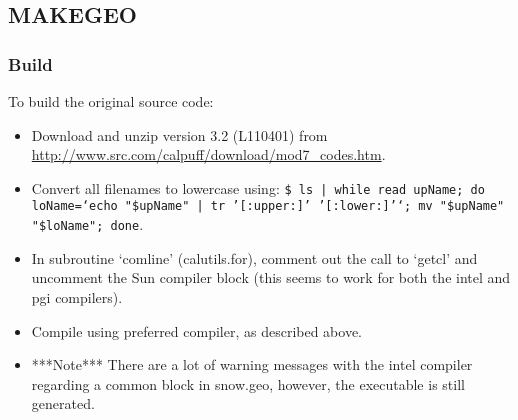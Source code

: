 \documentclass[10pt,a4paper]{article}
\begin{document}
\subsection{MAKEGEO}
\subsubsection{Build}
To build the original source code:
\begin{itemize}
\item Download and unzip version 3.2 (L110401) from \url{http://www.src.com/calpuff/download/mod7_codes.htm}.
\item Convert all filenames to lowercase using: \texttt{\$ ls | while read upName; do loName=`echo "\${upName}" | tr '[:upper:]' '[:lower:]'`; mv "\$upName" "\$loName"; done}.
\item In subroutine `comline' (calutils.for), comment out the call to `getcl' and uncomment the Sun compiler block (this seems to work for both the intel and pgi compilers).
\item Compile using preferred compiler, as described above.
\item ***Note*** There are a lot of warning messages with the intel compiler regarding a common block in snow.geo, however, the executable is still generated.
\end{itemize}
\end{document}
